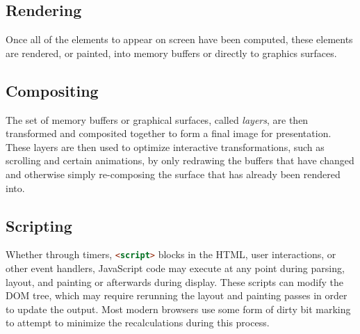 \subsection{Rendering}

Once all of the elements to appear on screen have been computed, these
elements are rendered, or painted, into memory buffers or directly to graphics
surfaces.

\subsection{Compositing}

The set of memory buffers or graphical surfaces, called \emph{layers}, are then
transformed and composited together to form a final image for
presentation.
These layers are then used to optimize interactive transformations, such as scrolling
and certain animations, by only redrawing the buffers that have changed and
otherwise simply re-composing the surface that has already been rendered into.

\subsection{Scripting}

Whether through timers, \lstinline[language=HTML]{<script>} blocks in the
HTML, user interactions, or other event handlers, JavaScript code may execute
at any point during parsing, layout, and painting or afterwards during
display.  These scripts can modify the DOM tree, which may require rerunning
the layout and painting passes in order to update the output.  Most modern
browsers use some form of dirty bit marking to attempt to minimize the
recalculations during this process.



